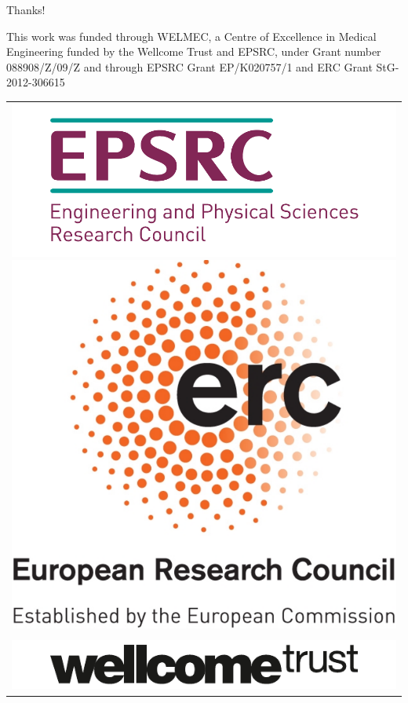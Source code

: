 \begin{frame}[noframenumbering]{Thanks!}

\vfill\hfill
\parbox[t]{.95\textwidth}{

This work was funded through WELMEC, a Centre of Excellence in Medical Engineering funded by the Wellcome Trust and EPSRC, under Grant number 088908/Z/09/Z and through EPSRC Grant EP/K020757/1 and ERC Grant StG-2012-306615
\begin{center}
\begin{tabular}[t]{c}
\\
\includegraphics[height=.2\paperheight,keepaspectratio]{figures/EPSRC.pdf}
\includegraphics[height=.2\paperheight,keepaspectratio]{figures/LOGO-ERC.pdf}\\
\\
\includegraphics[height=.07\paperheight,keepaspectratio]{figures/WellcomeTrust.pdf}
\end{tabular}
\end{center}

}
\end{frame}